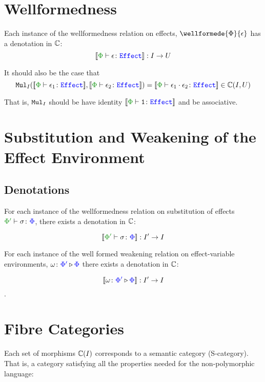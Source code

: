 \documentclass{report}
\begin{document}
\section{Wellformedness}

Each instance of the wellformedness relation on effects, $\wellformede{\P}{\e}$ has a denotation in $\mathbb{C}$: \begin{equation}
    \deno{\typerelation{\P}{\e}{\effect}}: I \rightarrow U
\end{equation}

It should also be the case that \begin{equation}
    \Mul_I(\deno{\typerelation{\P}{\e_1}{\effect}}, \deno{\typerelation{\P}{\e_2}{\effect}}) = \deno{\typerelation{\P}{\e_1\dot\e_2}{\effect}} \in \ciu
\end{equation}

That is, $\texttt{Mul}_I$ should be have identity $\deno{\typerelation{\P}{\1}{\effect}}$ and be associative.


\section{Substitution and Weakening of the Effect Environment}


\subsection{Denotations}


For each instance of the wellformedness relation on substitution of effects $\typerelation{\P'}{\si}{\P}$, there exists a denotation in $\mathbb{C}$:

\begin{equation}
    \deno{\typerelation{\P'}{\si}{\P}}: I'\rightarrow I
\end{equation}

For each instance of the well formed weakening relation on effect-variable environments, $\omega \colon {\color{blue}\Phi'} \triangleright {\color {blue} \Phi}$
 there exists a denotation in $\mathbb{C}$:

\begin{equation}
     {\bf [\![}\omega \colon {\color{blue}\Phi'} \triangleright {\color {blue} \Phi}{\bf ]\!]}: I'\rightarrow I
\end{equation}.

\section{Fibre Categories}
Each set of morphisms $\mathbb{C}(I)$ corresponds to a semantic category (S-category). That is, a category satisfying all the properties needed for the non-polymorphic language:
\end{document}
